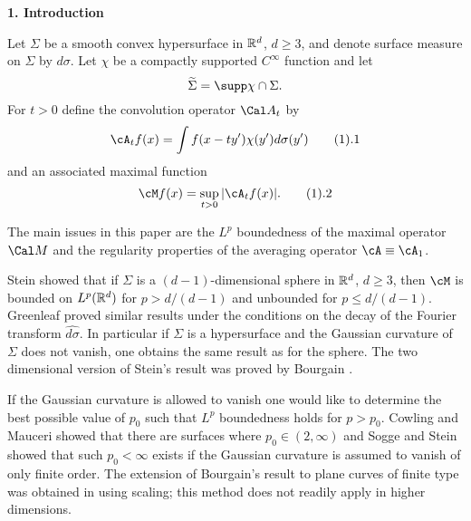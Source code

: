 \lc{\lesssim}
\gc{\gtrsim}
\ga{\gamma}             \Ga{\Gamma}
\eps{\varepsilon}                
\ep{\epsilon}
\la{\lambda}             \La{\Lambda}
\sig{\sigma}             \Sig{\Sigma}
\si{\sigma}              \Si{\Sigma}
\vphi{\varphi}
\ome{\omega}             \Ome{\Omega}
\om{\omega}              \Om{\Omega}
\ka{\kappa}
\tchi{{\widetilde \chi}}
\tka{{\widetilde \kappa}}
\txi{{\widetilde \xi}}
\teta{{\widetilde \eta}}
\tomega{{\widetilde \omega}}
\tzeta{{\widetilde \zeta}}
\tpsi{{\widetilde \psi}}
\tphi{{\widetilde \phi}}

\document


\head
{\bf 1.  Introduction}
\endhead

Let $\Sigma$ be a smooth  convex hypersurface 
in ${\Bbb R}^d$, $d\ge 3$, and 
denote surface measure  on $\Sigma$ by $d\sigma$.
Let $\chi$ be a compactly supported $C^\infty$ function
and let
$$\tSi= \supp \chi\cap \Sigma.$$
For $t>0$
define the convolution operator $\Cal A_t$ by
$$
\cA_t f(x)=\int f(x-ty')\chi(y')d\sigma(y')\tag 1.1
$$
and an associated maximal function
$$
\cM f(x) =\sup_{t>0}|\cA_t f(x)|. \tag 1.2
$$


The main issues in this paper are 
 the $L^p$ boundedness of the maximal operator
$\Cal M$ and the regularity properties of
the averaging operator $\cA\equiv \cA_1$.




Stein \cite{22}  showed that if $\Sigma$ is a $(d-1)$-dimensional sphere in 
$\Bbb R^{d}$, $d\ge 3$,
 then $\cM$ is bounded on $L^p(\Bbb R^d)$ for $p>d/(d-1)$ and unbounded 
for $p\le d/(d-1)$.
Greenleaf \cite{11}  proved similar results
under the  conditions on the decay of the Fourier transform 
$\widehat {d\sigma}$. In particular 
if  $\Sigma$ is a hypersurface  and
the Gaussian curvature of $\Sigma$ does not vanish, one obtains the 
same result as for the sphere.
 The two dimensional version of Stein's result was proved by Bourgain
\cite{1}.

If  the Gaussian curvature is allowed to vanish one would like to determine  
 the best possible value of $p_0$ such that $L^p$ boundedness holds 
for $p > p_0$. Cowling and Mauceri \cite{7} showed that there are surfaces 
where $p_0\in(2,\infty)$ and  Sogge and Stein \cite{21} showed that such 
$p_0<\infty$ exists if the Gaussian 
curvature is assumed to vanish of only finite order.
 The extension of Bourgain's result to plane curves of  finite type
was obtained 
in \cite{12} using  scaling; this method does not readily apply in 
higher dimensions.

